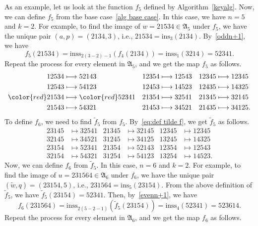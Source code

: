 \documentclass[12pt]{amsart}
\theoremstyle{definition}
\numberwithin{equation}{section}
\newcommand{\ins}[1]{\mathrm{ins}_{#1}}
\newcommand{\inss}[1]{\mathrm{inss}_{#1}}
\begin{document}
As an example, let us look at the function $f_5$ defined by Algorithm~\ref{keyalg}. Now, we can define $f_5$ from the base case~\eqref{alg base case}. In this case, we have $n=5$ and $k=2$. For example, to find the image of $w=21534 \in \mathfrak A_5$ under $f_5$, we have the unique pair $(a, p)=(2134, 3)$, i.e., $21534=\ins 3(2134)$. By~\eqref{oddn+1}, we have
\begin{equation*}
f_5(21534) = \inss {2(3-2)-1}(f_4(2134)) = \inss 1(3214) = 52341.\end{equation*}
Repeat the process for every element in $\mathfrak A_5$, and we get the map $f_5$ as follows.
\begin{align*}
    12534 &\longmapsto 52143 & 12354 &\longmapsto 12543 & 12345 &\longmapsto 12345 \\
    12543 &\longmapsto 54123 & 12453 &\longmapsto 14523 & 12435 &\longmapsto 14325 \\
    {\color{red}21534} & \longmapsto \color{red} 52341 & 21354 &\longmapsto 32541 & 21345 &\longmapsto 32145 \\
    21543 &\longmapsto 54321 & 21453 &\longmapsto 34521 & 21435 &\longmapsto 34125 .
\end{align*}
To define $f_6$, we need to find $\tilde{f}_5$ from $f_5$. By~\eqref{eq:def tilde f}, we get $\tilde{f}_5$ as follows.
\begin{align*}
    23145 &\longmapsto 32541 & 21345 &\longmapsto 32145 & 12345 &\longmapsto 12345 \\
    32145 &\longmapsto 34521 & 31245 &\longmapsto 34125 & 13245 &\longmapsto 14325 \\
    23154 &\longmapsto 52341 & 21354 &\longmapsto 52143 & 12354 &\longmapsto 12543 \\
    32154 &\longmapsto 54321 & 31254 &\longmapsto 54123 & 13254 &\longmapsto 14523.
\end{align*}
Now, we can define $f_6$ from $\tilde{f}_5$. In this case, $n=6$ and $k=2$. For example, to find the image of $u=231564 \in \mathfrak A_6$ under $f_6$, we have the unique pair $(\tilde{w}, q)=(23154,5)$, i.e., $231564 = \ins 5(23154)$. From the above definition of $\tilde{f}_5$, we have $\tilde{f}_5(23154) = 52341$. Then, by~\eqref{evenn+1}, we have
\begin{equation*}
    f_6(231564) = \inss {2(5-2-1)}(\tilde{f}_5(23154)) = \inss {4}(52341) = 523614.
\end{equation*}
Repeat the process for every element in $\mathfrak A_6$, and we get the map $f_6$ as follows.
\end{document}
